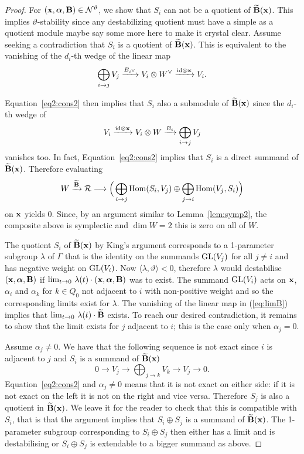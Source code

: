 \documentclass{amsart}
\newcommand{\balpha}{\boldsymbol{\alpha}}
\theoremstyle{definition}
\begin{document}
\begin{proof}
For $(\bfx, \balpha, \bfB) \in \cN^\vartheta$, we show that $S_i$ can not be a quotient of $\widetilde{\mathbf{B}}(\mathbf{x})$. This implies $\vartheta$-stability since any destabilizing quotient must have a simple as a quotient module {\red maybe say some more here to make it crystal clear}.
Assume seeking a contradiction that $S_i$ is a quotient of $\widetilde{\mathbf{B}}(\mathbf{x})$.
This is equivalent to the vanishing of the $d_i$-th wedge of the linear map
$$\bigoplus_{i \rightarrow j} V_j \xrightarrow{B_{i^\vee}} V_i \otimes W^\vee \xrightarrow{\text{id} \otimes \mathbf{x}} V_i.$$

Equation~\ref{eq2:cons2} then implies that $S_i$ also a submodule of $\widetilde{\mathbf{B}}(\mathbf{x})$ since the $d_i$-th wedge of 
$$V_i \xrightarrow{\text{id} \otimes \mathbf{x}} V_i \otimes W \xrightarrow{B_i} \bigoplus_{i \rightarrow j} V_j$$
vanishes too.
In fact, Equation~\ref{eq2:cons2} implies that $S_i$ is a direct summand of $\widetilde{\mathbf{B}}(\mathbf{x})$.
Therefore evaluating 
\begin{equation}\label{eq:limB}
W \xrightarrow{\widetilde{\mathbf{B}}} \mathcal{R} \longrightarrow \Big(\bigoplus_{i \rightarrow j} \operatorname{Hom}(S_i,V_j) \oplus \bigoplus_{j \rightarrow i} \operatorname{Hom}(V_j, S_i)\Big)
\end{equation}
on $\mathbf{x}$ yields 0.
Since, by an argument similar to Lemma~\ref{lem:symp2}, the composite above is symplectic and $\dim W=2$ this is zero on all of $W$.

The quotient $S_i$ of $\widetilde{\mathbf{B}}(\mathbf{x})$ by King's argument corresponds to a 1-parameter subgroup $\lambda$ of $\Gamma$ that is the identity on the summands $\operatorname{GL}(V_j)$ for all $j\neq i$ and has negative weight on $\operatorname{GL}(V_i)$. 
Now $\langle \lambda, \vartheta\rangle <0$, therefore $\lambda$ would destabilise $(\bfx, \balpha, \bfB)$ if $\lim_{t \rightarrow 0} \, \lambda(t)\cdot (\bfx, \balpha, \bfB)$ was to exist.
The summand $\operatorname{GL}(V_i)$ acts on $\mathbf{x}$, $\alpha_i$ and $\alpha_k$ for $k \in Q_0$ not adjacent to $i$ with non-positive weight and so the corresponding limits exist for $\lambda$.
The vanishing of the linear map in (\ref{eq:limB}) implies that $\lim_{t \rightarrow 0}\, \lambda(t)\cdot \widetilde{\mathbf{B}}$ exists.
To reach our desired contradiction, it remains to show that the limit exists for $j$ adjacent to $i$; this is the case only when $\alpha_j=0$.

Assume $\alpha_j \neq 0$.
We have that the following sequence is not exact since $i$ is adjacent to $j$ and $S_i$ is a summand of $\widetilde{\mathbf{B}}(\mathbf{x})$
$$0 \longrightarrow V_j \longrightarrow \bigoplus_{j \rightarrow k} V_k \longrightarrow V_j \longrightarrow 0.$$
Equation~\ref{eq2:cons2} and $\alpha_j \neq 0$ means that it is not exact on either side: if it is not exact on the left it is not on the right and vice versa.
Therefore $S_j$ is also a quotient in $\widetilde{\mathbf{B}}(\mathbf{x})$.
We leave it for the reader to check that this is compatible with $S_i$, that is that the argument implies that $S_i \oplus S_j$ is a summand of $\widetilde{\mathbf{B}}(\mathbf{x})$.
The 1-parameter subgroup corresponding to $S_i \oplus S_j$ then either has a limit and is destabilising or $S_i \oplus S_j$ is extendable to a bigger summand as above.
\end{proof}
\end{document}
